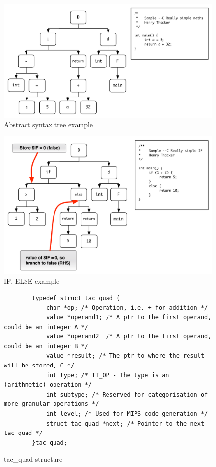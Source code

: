 \begin{figure}[p]
	\includegraphics[scale=0.7]{ast-include.pdf}
	\caption{Abstract syntax tree example}
	\label{fig:ast}
\end{figure}

\begin{figure}[p]
	\includegraphics[scale=0.7]{if-include.pdf}
	\caption{IF, ELSE example}
	\label{fig:if}
\end{figure}

\begin{figure}[p]
	\begin{verbatim}
		typedef struct tac_quad {
		    char *op; /* Operation, i.e. + for addition */
		    value *operand1; /* A ptr to the first operand, could be an integer A */
		    value *operand2  /* A ptr to the first operand, could be an integer B */
		    value *result; /* The ptr to where the result will be stored, C */
		    int type; /* TT_OP - The type is an (arithmetic) operation */
		    int subtype; /* Reserved for categorisation of more granular operations */
		    int level; /* Used for MIPS code generation */
		    struct tac_quad *next; /* Pointer to the next tac_quad */		
		}tac_quad;
	\end{verbatim}
	\caption{tac\_quad structure}
	\label{fig:tacquad}
\end{figure}

